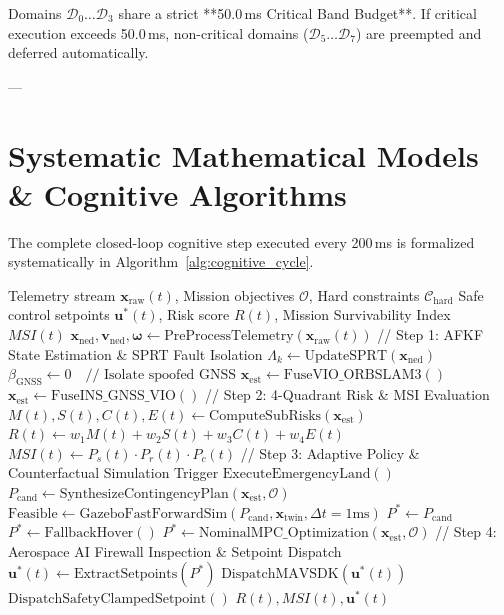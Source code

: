 \documentclass[pdflatex,sn-mathphys-num]{sn-jnl}%
\theoremstyle{thmstyleone}%
\theoremstyle{thmstyletwo}%
\theoremstyle{thmstylethree}%
\begin{document}
Domains $\mathcal{D}_0 \dots \mathcal{D}_3$ share a strict **50.0\,ms Critical Band Budget**. If critical execution exceeds 50.0\,ms, non-critical domains ($\mathcal{D}_5 \dots \mathcal{D}_7$) are preempted and deferred automatically.

---

\section{Systematic Mathematical Models \& Cognitive Algorithms}\label{sec:math}

The complete closed-loop cognitive step executed every 200\,ms is formalized systematically in Algorithm~\ref{alg:cognitive_cycle}.

\begin{algorithm}[t]
\caption{Drone-N1 Closed-Loop Cognitive Cycle \& Counterfactual Validation}
\label{alg:cognitive_cycle}
\begin{algorithmic}[1]
\Require Telemetry stream $\mathbf{x}_{\text{raw}}(t)$, Mission objectives $\mathcal{O}$, Hard constraints $\mathcal{C}_{\text{hard}}$
\Ensure Safe control setpoints $\mathbf{u}^*(t)$, Risk score $R(t)$, Mission Survivability Index $MSI(t)$
\State $\mathbf{x}_{\text{ned}}, \mathbf{v}_{\text{ned}}, \boldsymbol{\omega} \gets \text{PreProcessTelemetry}(\mathbf{x}_{\text{raw}}(t))$
\State // Step 1: AFKF State Estimation \& SPRT Fault Isolation
\State $\Lambda_k \gets \text{UpdateSPRT}(\mathbf{x}_{\text{ned}})$
    \State $\beta_{\text{GNSS}} \gets 0 \quad \text{// Isolate spoofed GNSS}$
    \State $\mathbf{x}_{\text{est}} \gets \text{FuseVIO\_ORBSLAM3}()$
\Else
    \State $\mathbf{x}_{\text{est}} \gets \text{FuseINS\_GNSS\_VIO}()$
\EndIf
\State // Step 2: 4-Quadrant Risk \& MSI Evaluation
\State $M(t), S(t), C(t), E(t) \gets \text{ComputeSubRisks}(\mathbf{x}_{\text{est}})$
\State $R(t) \gets w_1 M(t) + w_2 S(t) + w_3 C(t) + w_4 E(t)$
\State $MSI(t) \gets P_s(t) \cdot P_r(t) \cdot P_c(t)$
\State // Step 3: Adaptive Policy \& Counterfactual Simulation Trigger
    \State \Return $\text{ExecuteEmergencyLand}()$
    \State $P_{\text{cand}} \gets \text{SynthesizeContingencyPlan}(\mathbf{x}_{\text{est}}, \mathcal{O})$
    \State $\text{Feasible} \gets \text{GazeboFastForwardSim}(P_{\text{cand}}, \mathbf{x}_{\text{twin}}, \Delta t=1\text{ms})$
        \State $P^* \gets P_{\text{cand}}$
    \Else
        \State $P^* \gets \text{FallbackHover}()$
    \EndIf
\Else
    \State $P^* \gets \text{NominalMPC\_Optimization}(\mathbf{x}_{\text{est}}, \mathcal{O})$
\EndIf
\State // Step 4: Aerospace AI Firewall Inspection \& Setpoint Dispatch
\State $\mathbf{u}^*(t) \gets \text{ExtractSetpoints}(P^*)$
    \State $\text{DispatchMAVSDK}(\mathbf{u}^*(t))$
\Else
    \State $\text{DispatchSafetyClampedSetpoint}()$
\EndIf
\State \Return $R(t), MSI(t), \mathbf{u}^*(t)$
\end{algorithmic}
\end{algorithm}
\end{document}
